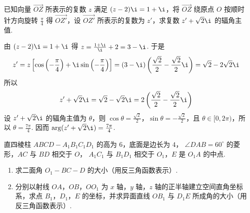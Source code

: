 \documentclass[UTF8,a4paper,oneside,11pt]{ctexbook}
\begin{document}
\begin{problem}
已知向量 \(\overrightarrow{OZ}\) 所表示的复数 \(z\) 满足 \((z - 2)\i = 1 + \i\)，将 \(\overrightarrow{OZ}\) 绕原点 \(O\) 按顺时针方向旋转 \(\frac{\pi}{4}\) 得 \(\overrightarrow{OZ'}\)，设 \(\overrightarrow{OZ'}\) 所表示的复数为 \(z'\)，求复数 \(z' + \sqrt{2}\i\) 的辐角主值.
\end{problem}

\begin{solution}
由 \((z-2)\i=1+\i\) 得 \(z=\frac{1+\i}{\i}+2=3-\i\).
于是
\[
z'=z\left[\cos\left(-\frac{\pi}{4}\right)+\i\sin\left(-\frac{\pi}{4}\right)\right]
=(3-\i)\left(\frac{\sqrt{2}}{2}-\frac{\sqrt{2}}{2}\i\right)
=\sqrt{2}-2\sqrt{2}\i
\]
所以
\[
z'+\sqrt{2}\i=\sqrt{2}-\sqrt{2}\i
=2\left(\frac{\sqrt{2}}{2}-\frac{\sqrt{2}}{2}\i\right)
\]
设 \(z'+\sqrt{2}\i\) 的辐角主值为 \(\theta\)，则 \(\cos\theta=\frac{\sqrt{2}}{2}\)，\(\sin\theta=-\frac{\sqrt{2}}{2}\)，且 \(\theta\in[0,2\pi)\)，所以 \(\theta=\frac{7\pi}{4}\). 因而 \(\arg(z'+\sqrt{2}\i)=\frac{7\pi}{4}\).
\end{solution}

\begin{problem}
直四棱柱 \(ABCD - A_{1}B_{1}C_{1}D_{1} \) 的高为 \(6\)，底面是边长为 \(4\)， \(\angle DAB = 60^{\circ} \) 的菱形，\(AC\) 与 \(BD\) 相交于 \(O\)， \(A_{1}C_{1}\) 与 \(B_{1}D_{1}\) 相交于 \(O_{1}\)，\(E\) 是 \(O_{1}A\) 的中点.

\begin{enumerate}
\item 求二面角 \(O_{1}-BC-D \) 的大小（用反三角函数表示）.
\item 分别以射线 \(OA\)，\(OB\)，\(OO_{1}\) 为 \(x\) 轴，\(y\) 轴，\(z\) 轴的正半轴建立空间直角坐标系，求点 \(B_{1}\)，\(D_{1}\)，\(E\) 的坐标，并求异面直线 \(OB_{1}\) 与 \(D_{1}E\) 所成角的大小（用反三角函数表示）.
\end{enumerate}

\end{problem}
\end{document}
